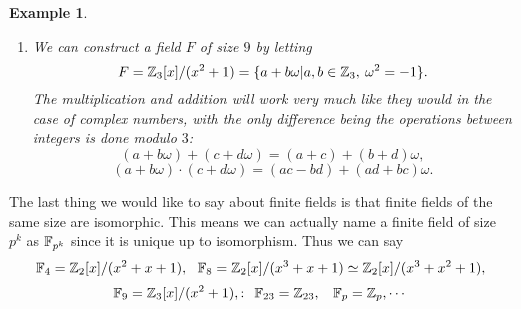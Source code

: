 \documentclass[12pt]{article}
\theoremstyle{plain}
\newtheorem{example}{Example}
\theoremstyle{definition}
\theoremstyle{remark}
\begin{document}
\begin{example}
\begin{enumerate}
\begin{table}[H]
{\begin{tabular}{ c| c | c |c|c|c|c|c|c}
\end{tabular}
}
\end{table}


\begin{table}[H]
\footnotesize{
\begin{tabular}{ c| c | c |c|c|c|c|c|c}
$\cdot$  & $0$ & $1$ & $\omega$ & $\omega^2$ & $1+\omega$ & $1+\omega^2$ & $\omega+\omega^2$ & $1+\omega+\omega^2$ \\
\hline
$0$ &$0$ & $0$ & $0$ & $0$ & $0$ & $0$ & $0$ & $0$   \\ 
\hline
$1$ & $0$ & $1$ & $\omega$ & $\omega^2$ & $1+\omega$ & $1+\omega^2$ & $\omega+\omega^2$ & $1+\omega+\omega^2$ \\ 
\hline
$\omega$ & $0$ & $\omega$ & $\omega^2$ & $1+\omega$  & $\omega+\omega^2$ & $1$ & $1+\omega+\omega^2$ & $1+\omega^2$\\ \hline
$\omega^2$ & $0$ & $\omega^2$ & $1+\omega$&$\omega+\omega^2$ & $1+\omega+\omega^2$ &$\omega$& $1+\omega^2$ & $1$\\
\hline
$1+\omega$ & $0$& $1+\omega$ & $\omega+\omega^2$&$1+\omega+\omega^2$ & $1+\omega^2$ &$\omega^2$& $1$ & $\omega$\\
\hline
$1+\omega^2$ & $0$& $1+\omega^2$&$1$ & $\omega$&$\omega^2$ &$1+\omega+\omega^2$& $1+\omega$ & $\omega+\omega^2$\\
\hline
$\omega+\omega^2$ & $0$&$\omega+\omega^2$& $1+\omega+\omega^2$&$1+\omega^2$ & $1$&$1+\omega$ &$\omega$& $\omega^2$\\
\hline
$1+\omega+\omega^2$ & $0$&$1+\omega+\omega^2$& $1+\omega^2$&$1$ & $\omega$&$\omega+\omega^2$ &$\omega^2$& $1+\omega$\\
\end{tabular}
}
\end{table}

\item We can construct a field $F$ of size $9$ by letting 
$$F = \mathbb{Z}_3[x]/(x^2+1) = \{a+b\omega|a, b\in \mathbb{Z}_3, \:\omega^2=-1\}.$$
The multiplication and addition will work very much like they would in the case of complex numbers, with the only difference being the operations between integers is done modulo $3$:
$$(a+b\omega)+(c+d\omega) = (a+c)+(b+d)\omega,$$
$$(a+b\omega)\cdot(c+d\omega)=(ac-bd)+(ad+bc)\omega.$$
\end{enumerate}
\end{example}
The last thing we would like to say about finite fields is that finite fields of the same size are isomorphic. This means we can actually name a finite field of size $p^k$ as $\mathbb{F}_{p^k}$ since it is unique up to isomorphism. 
Thus we can say 
$$\mathbb{F}_4 = \mathbb{Z}_2[x]/(x^2+x+1), \:\:\: \mathbb{F}_8 = \mathbb{Z}_2[x]/(x^3+x+1) \simeq \mathbb{Z}_2[x]/(x^3+x^2+1),$$
$$\mathbb{F}_9 = \mathbb{Z}_3[x]/(x^2+1),:\:\: \mathbb{F}_{23}=\mathbb{Z}_{23}, \:\:\:\: \mathbb{F}_p=\mathbb{Z}_p, \cdots $$
\end{document}
